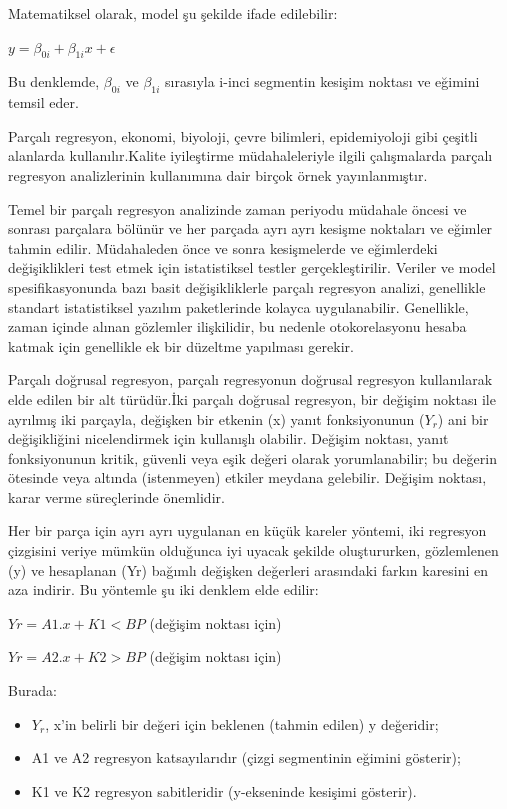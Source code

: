 \documentclass[12pt,twoside]{deuthesis}
\begin{document}
Matematiksel olarak, model şu şekilde ifade edilebilir:

\(y = \beta_{0i} + \beta_{1i} x + \epsilon\)

Bu denklemde, \(\beta_{0i}\) ve \(\beta_{1i}\) sırasıyla i-inci segmentin kesişim noktası ve eğimini temsil eder.

Parçalı regresyon, ekonomi, biyoloji, çevre bilimleri, epidemiyoloji gibi çeşitli alanlarda kullanılır.Kalite iyileştirme müdahaleleriyle ilgili çalışmalarda parçalı regresyon analizlerinin kullanımına dair birçok örnek yayınlanmıştır.

Temel bir parçalı regresyon analizinde zaman periyodu müdahale öncesi ve sonrası parçalara bölünür ve her parçada ayrı ayrı kesişme noktaları ve eğimler tahmin edilir. Müdahaleden önce ve sonra kesişmelerde ve eğimlerdeki değişiklikleri test etmek için istatistiksel testler gerçekleştirilir. Veriler ve model spesifikasyonunda bazı basit değişikliklerle parçalı regresyon analizi, genellikle standart istatistiksel yazılım paketlerinde kolayca uygulanabilir. Genellikle, zaman içinde alınan gözlemler ilişkilidir, bu nedenle otokorelasyonu hesaba katmak için genellikle ek bir düzeltme yapılması gerekir.

Parçalı doğrusal regresyon, parçalı regresyonun doğrusal regresyon kullanılarak elde edilen bir alt türüdür.İki parçalı doğrusal regresyon, bir değişim noktası ile ayrılmış iki parçayla, değişken bir etkenin (x) yanıt fonksiyonunun (\(Y_{r}\)) ani bir değişikliğini nicelendirmek için kullanışlı olabilir. Değişim noktası, yanıt fonksiyonunun kritik, güvenli veya eşik değeri olarak yorumlanabilir; bu değerin ötesinde veya altında (istenmeyen) etkiler meydana gelebilir. Değişim noktası, karar verme süreçlerinde önemlidir.

Her bir parça için ayrı ayrı uygulanan en küçük kareler yöntemi, iki regresyon çizgisini veriye mümkün olduğunca iyi uyacak şekilde oluştururken, gözlemlenen (y) ve hesaplanan (Yr) bağımlı değişken değerleri arasındaki farkın karesini en aza indirir. Bu yöntemle şu iki denklem elde edilir:

\(Yr = A1.x+K1 <BP\) (değişim noktası için)

\(Yr = A2.x+K2 >BP\) (değişim noktası için)

Burada:

\begin{itemize}
\item $Y_{r}$, x'in belirli bir değeri için beklenen (tahmin edilen) y değeridir;
\item A1 ve A2 regresyon katsayılarıdır (çizgi segmentinin eğimini gösterir);
\item K1 ve K2 regresyon sabitleridir (y-ekseninde kesişimi gösterir).
\end{itemize}
\end{document}
